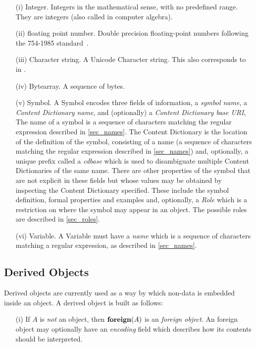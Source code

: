 \begin{itemize}
\item[(i)] Integer.  Integers in the mathematical sense, with no predefined range.  They
  are  integers (also called  in computer
  algebra).
\item[(ii)]  floating point number.  Double precision floating-point numbers
  following the  754-1985 standard~\cite{ieee754_85}.
\item[(iii)] Character string.  A Unicode Character string. This also corresponds to
   in \XML.
\item[(iv)] Bytearray.  A sequence of bytes.
\item[(v)] Symbol.  A Symbol encodes three fields of information, a \emph{symbol name}, a
  \emph{Content Dictionary name}, and (optionally) a \emph{Content Dictionary base URI},
  The name of a symbol is a sequence of characters matching the regular expression
  described in \ref{sec_names}.  The Content Dictionary is the location of the definition
  of the symbol, consisting of a name (a sequence of characters matching the regular
  expression described in \ref{sec_names}) and, optionally, a unique prefix called a
  \emph{cdbase} which is used to disambiguate multiple Content Dictionaries of the same
  name.  There are other properties of the symbol that are not explicit in these fields
  but whose values may be obtained by inspecting the Content Dictionary specified. These
  include the symbol definition, formal properties and examples and, optionally, a
  \emph{Role} which is a restriction on where the symbol may appear in an \OM object.  The
  possible roles are described in \ref{sec_roles}.
\item[(vi)] Variable.  A Variable must have a \emph{name} which is a sequence of
  characters matching a regular expression, as described in \ref{sec_names}.
\end{itemize}

\subsection{Derived \OM Objects}\label{sec_derived}

Derived \OM objects are currently used as a way by which non-\OM data is embedded inside
an \OM object.  A derived \OM object is built as follows:
\begin{itemize}
\item[(i)] If $A$ is \emph{not} an \OM object, then $\mathbf{foreign}(A)$ is an \OM \emph{foreign
    object}.  An \OM foreign object may optionally have an \emph{encoding} field which
  describes how its contents should be interpreted.
\end{itemize}

